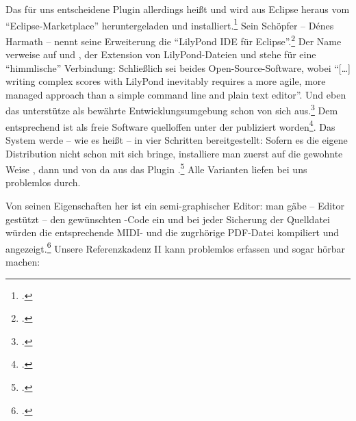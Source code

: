 Das für uns entscheidene Plugin allerdings heißt  und wird aus
Eclipse heraus vom \enquote{Eclipse-Marketplace} heruntergeladen und
installiert.\footcite[vgl.][\nopage wp]{Harmath2019a} Sein Schöpfer -- Dénes
Harmath -- nennt seine Erweiterung die \enquote{LilyPond IDE für
Eclipse}.\footcite[vgl.][\nopage wp]{Harmath2019b} Der Name 
verweise auf  und , der Extension von LilyPond-Dateien und
stehe für eine \enquote{himmlische} Verbindung: Schließlich sei beides
Open-Source-Software, wobei \enquote{[\ldots] writing complex scores with
LilyPond inevitably requires a more agile, more managed approach than a simple
command line and plain text editor}. Und eben das unterstütze  als
bewährte Entwicklungsumgebung schon von sich aus.\footcite[vgl.][\nopage
wp]{Harmath2019d} Dem entsprechend ist  als freie Software
quelloffen unter der  publiziert
worden\footcite[vgl.][\nopage wp]{Harmath2018a}. Das System werde -- wie es
heißt -- in vier Schritten bereitgestellt: Sofern es die eigene Distribution
nicht schon mit sich bringe, installiere man zuerst auf die gewohnte Weise
, dann  und von da aus das Plugin
.\footcite[vgl.][\nopage wp]{Harmath2019c} Alle Varianten liefen
bei uns problemlos durch.

Von seinen Eigenschaften her ist  ein semi-graphischer Editor: man
gäbe -- Editor gestützt -- den gewünschten -Code ein und bei jeder
Sicherung der Quelldatei würden die entsprechende MIDI- und die zugrhörige
PDF-Datei kompiliert und angezeigt.\footcite[vgl.][\nopage wp]{Harmath2019e}
Unsere Referenzkadenz II kann  problemlos erfassen und sogar
hörbar machen:




%
